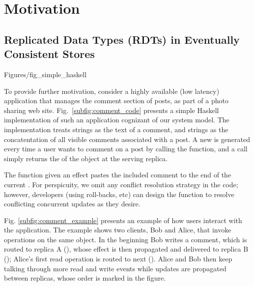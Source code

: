 \newpage
\section{Motivation}
\label {sec:motiv}
%
\subsection{Replicated Data Types (RDTs) in Eventually Consistent Stores}
 {Figures/fig_simple_haskell}

To provide further motivation, consider a highly available (low
latency) application that manages the comment section of posts, as
part of a photo sharing web site.  Fig.~\ref{subfig:comment_code}
presents a simple Haskell implementation of such an application
cognizant of our system model.  The implementation treats
\effectC{} strings as the text of a comment, and 
\stateC{} strings as the concatentation of all visible comments associated
with a post.  A new \effectC{} is generated every time a user wants to
comment on a post by calling the \writeC{} function, and a \readC{}
call simply returns the \stateC{} of the object at the serving
replica.

The \applyC{} function given an effect pastes the included comment to
the end of the current \stateC{}.  For perspicuity, we omit any
conflict resolution strategy in the code; however, developers (using
roll-backs, etc) can design the \applyC{} function to resolve
conflicting concurrent updates as they desire.

Fig. \ref{subfig:comment_example} presents an example of how users
interact with the application. The example shows two clients, Bob and
Alice, that invoke operations on the same object. In the beginning Bob
writes a comment, which is routed to replica A (), whose
effect is then propagated and delivered to replica B ();
Alice's first read operation is routed to next (). Alice and
Bob then keep talking through more read and write events while updates
are propagated between replicas, whose order is marked in the figure.

